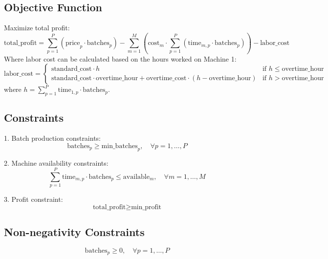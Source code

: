 \documentclass{article}
\begin{document}
\subsection*{Objective Function}
Maximize total profit:
\[
\text{total\_profit} = \sum_{p=1}^{P} \left( \text{price}_{p} \cdot \text{batches}_{p} \right) - \sum_{m=1}^{M} \left( \text{cost}_{m} \cdot \sum_{p=1}^{P} \left( \text{time}_{m,p} \cdot \text{batches}_{p} \right) \right) - \text{labor\_cost}
\]
Where labor cost can be calculated based on the hours worked on Machine 1:
\[
\text{labor\_cost} = \begin{cases}
\text{standard\_cost} \cdot h & \text{if } h \leq \text{overtime\_hour} \\
\text{standard\_cost} \cdot \text{overtime\_hour} + \text{overtime\_cost} \cdot (h - \text{overtime\_hour}) & \text{if } h > \text{overtime\_hour}
\end{cases}
\]
where \( h = \sum_{p=1}^{P} \text{time}_{1,p} \cdot \text{batches}_{p} \).

\subsection*{Constraints}
1. Batch production constraints:
   \[
   \text{batches}_{p} \geq \text{min\_batches}_{p}, \quad \forall p = 1, \ldots, P
   \]
   
2. Machine availability constraints:
   \[
   \sum_{p=1}^{P} \text{time}_{m,p} \cdot \text{batches}_{p} \leq \text{available}_{m}, \quad \forall m = 1, \ldots, M
   \]
   
3. Profit constraint:
   \[
   \text{total\_profit} \geq \text{min\_profit}
   \]

\subsection*{Non-negativity Constraints}
\[
\text{batches}_{p} \geq 0, \quad \forall p = 1, \ldots, P
\]
\end{document}

